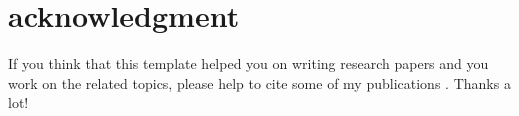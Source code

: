 \section{acknowledgment}
\label{sec:ack}

If you think that this template helped you on writing research papers and you work on the related topics, please help to cite some of my publications 
\cite{cheng2016task, cheng2017utility, chen2014gmission, cheng2015reliable,  cheng2017prediction, chen2018effective, cheng2018experimental, cheng2018frog, cheng2019cooperation, chen2019minimize}. Thanks a lot!